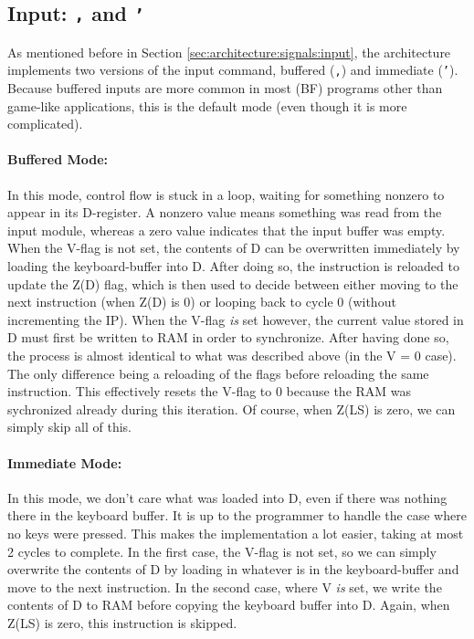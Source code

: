 \subsection{Input: \texttt{,} and \texttt{'}}
As mentioned before in Section \ref{sec:architecture:signals:input}, the architecture implements two versions of the input command, buffered (\texttt{,}) and immediate (\texttt{'}). Because buffered inputs are more common in most (BF) programs other than game-like applications, this is the default mode (even though it is more complicated).

\paragraph{Buffered Mode:}
In this mode, control flow is stuck in a loop, waiting for something nonzero to appear in its D-register. A nonzero value means something was read from the input module, whereas a zero value indicates that the input buffer was empty. When the V-flag is not set, the contents of D can be overwritten immediately by loading the keyboard-buffer into D. After doing so, the instruction is reloaded to update the Z(D) flag, which is then used to decide between either moving to the next instruction (when Z(D) is 0) or looping back to cycle 0 (without incrementing the IP). When the V-flag \emph{is} set however, the current value stored in D must first be written to RAM in order to synchronize.  After having done so, the process is almost identical to what was described above (in the V = 0 case). The only difference being a reloading of the flags before reloading the same instruction. This effectively resets the V-flag to 0 because the RAM was sychronized already during this iteration. Of course, when Z(LS) is zero, we can simply skip all of this.

\paragraph{Immediate Mode:}
In this mode, we don't care what was loaded into D, even if there was nothing there in the keyboard buffer. It is up to the programmer to handle the case where no keys were pressed. This makes the implementation a lot easier, taking at most 2 cycles to complete. In the first case, the V-flag is not set, so we can simply overwrite the contents of D by loading in whatever is in the keyboard-buffer and move to the next instruction. In the second case, where V \emph{is} set, we write the contents of D to RAM before copying the keyboard buffer into D. Again, when Z(LS) is zero, this instruction is skipped.
  



  



  





